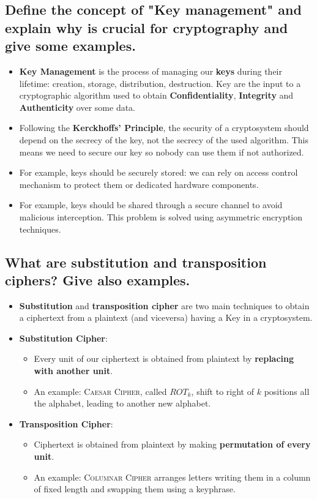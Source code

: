 \documentclass[9pt, letterpaper]{article}
\begin{document}
\subsection{Define the concept of "Key management" and explain why is crucial for cryptography and give some examples.}
\begin{itemize}
	\item \textbf{Key Management} is the process of managing our \textbf{keys} during their lifetime: creation, storage, distribution, destruction. Key are the input to a cryptographic algorithm used to obtain \textbf{Confidentiality}, \textbf{Integrity} and \textbf{Authenticity} over some data.
	\item Following the \textbf{Kerckhoffs' Principle}, the security of a cryptosystem should depend on the secrecy of the key, not the secrecy of the used algorithm. This means we need to secure our key so nobody can use them if not authorized.
	\item For example, keys should be securely stored: we can rely on access control mechanism to protect them or dedicated hardware components.
	\item For example, keys should be shared through a secure channel to avoid malicious interception. This problem is solved using asymmetric encryption techniques.
\end{itemize}

\subsection{What are substitution and transposition ciphers? Give also examples.}
\begin{itemize}
	\item \textbf{Substitution} and \textbf{transposition cipher} are two main techniques to obtain a ciphertext from a plaintext (and viceversa) having a Key in a cryptosystem.
	\item \textbf{Substitution Cipher}:
	      \begin{itemize}
		      \item Every unit of our ciphertext is obtained from plaintext by \textbf{replacing with another unit}.
		      \item An example: \textsc{Caesar Cipher}, called $ROT_k$, shift to right of $k$ positions all the alphabet, leading to another new alphabet.
	      \end{itemize}

	\item \textbf{Transposition Cipher}:
	      \begin{itemize}
		      \item Ciphertext is obtained from plaintext by making \textbf{permutation of every unit}.
		      \item An example: \textsc{Columnar Cipher} arranges letters writing them in a column of fixed length and swapping them using a keyphrase.

	      \end{itemize}
\end{itemize}
\end{document}

